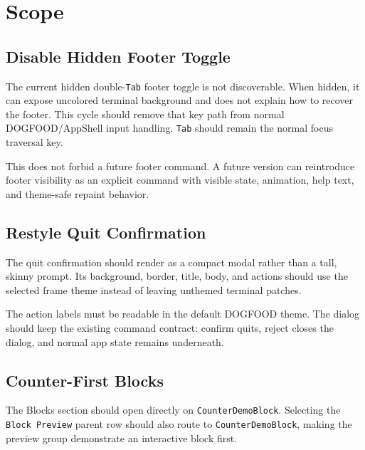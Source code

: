 \section{Scope}\label{record-115-scope}

\subsection{Disable Hidden Footer Toggle}\label{record-115-disable-hidden-footer-toggle}

The current hidden double-\texttt{T\allowbreak{}a\allowbreak{}b} footer toggle is not discoverable. When hidden, it can expose uncolored terminal background and does not explain how to recover the footer. This cycle should remove that key path from normal DOGFOOD/AppShell input handling. \texttt{T\allowbreak{}a\allowbreak{}b} should remain the normal focus traversal key.

This does not forbid a future footer command. A future version can reintroduce footer visibility as an explicit command with visible state, animation, help text, and theme-safe repaint behavior.

\subsection{Restyle Quit Confirmation}\label{record-115-restyle-quit-confirmation}

The quit confirmation should render as a compact modal rather than a tall, skinny prompt. Its background, border, title, body, and actions should use the selected frame theme instead of leaving unthemed terminal patches.

The action labels must be readable in the default DOGFOOD theme. The dialog should keep the existing command contract: confirm quits, reject closes the dialog, and normal app state remains underneath.

\subsection{Counter-First Blocks}\label{record-115-counter-first-blocks}

The Blocks section should open directly on \texttt{C\allowbreak{}o\allowbreak{}u\allowbreak{}n\allowbreak{}t\allowbreak{}e\allowbreak{}r\allowbreak{}D\allowbreak{}e\allowbreak{}m\allowbreak{}o\allowbreak{}B\allowbreak{}l\allowbreak{}o\allowbreak{}c\allowbreak{}k}. Selecting the \texttt{B\allowbreak{}l\allowbreak{}o\allowbreak{}c\allowbreak{}k\allowbreak{} \allowbreak{}P\allowbreak{}r\allowbreak{}e\allowbreak{}v\allowbreak{}i\allowbreak{}e\allowbreak{}w} parent row should also route to \texttt{C\allowbreak{}o\allowbreak{}u\allowbreak{}n\allowbreak{}t\allowbreak{}e\allowbreak{}r\allowbreak{}D\allowbreak{}e\allowbreak{}m\allowbreak{}o\allowbreak{}B\allowbreak{}l\allowbreak{}o\allowbreak{}c\allowbreak{}k}, making the preview group demonstrate an interactive block first.


